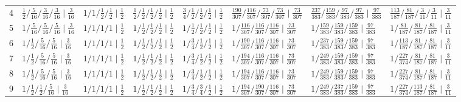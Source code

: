 {\begin{tabular}{rlllllll}
4 & $\tfrac{1}{2}/\tfrac{5}{16}/\tfrac{3}{16}/\tfrac{3}{16} \mid \tfrac{3}{16}$ & $1/1/\tfrac{1}{2}/\tfrac{1}{2} \mid \tfrac{1}{2}$ & $\tfrac{1}{2}/\tfrac{1}{2}/\tfrac{1}{2}/\tfrac{1}{2} \mid \tfrac{1}{2}$ & $\tfrac{3}{4}/\tfrac{1}{2}/\tfrac{1}{2}/\tfrac{1}{2} \mid \tfrac{1}{2}$ & $\tfrac{190}{307}/\tfrac{116}{307}/\tfrac{73}{307}/\tfrac{73}{307} \mid \tfrac{73}{307}$ & $\tfrac{237}{383}/\tfrac{159}{383}/\tfrac{97}{383}/\tfrac{97}{383} \mid \tfrac{97}{383}$ & $\tfrac{113}{187}/\tfrac{81}{187}/\tfrac{3}{11}/\tfrac{3}{11} \mid \tfrac{3}{11}$\\
5 & $1/\tfrac{5}{16}/\tfrac{5}{16}/\tfrac{5}{16} \mid \tfrac{3}{16}$ & $1/1/1/1 \mid \tfrac{1}{2}$ & $1/\tfrac{1}{2}/\tfrac{1}{2}/\tfrac{1}{2} \mid \tfrac{1}{2}$ & $1/\tfrac{1}{2}/\tfrac{1}{2}/\tfrac{1}{2} \mid \tfrac{1}{2}$ & $1/\tfrac{116}{307}/\tfrac{116}{307}/\tfrac{116}{307} \mid \tfrac{73}{307}$ & $1/\tfrac{159}{383}/\tfrac{159}{383}/\tfrac{159}{383} \mid \tfrac{97}{383}$ & $1/\tfrac{81}{187}/\tfrac{81}{187}/\tfrac{81}{187} \mid \tfrac{3}{11}$\\
6 & $1/\tfrac{1}{2}/\tfrac{5}{16}/\tfrac{5}{16} \mid \tfrac{3}{16}$ & $1/1/1/1 \mid \tfrac{1}{2}$ & $1/\tfrac{1}{2}/\tfrac{1}{2}/\tfrac{1}{2} \mid \tfrac{1}{2}$ & $1/\tfrac{3}{4}/\tfrac{1}{2}/\tfrac{1}{2} \mid \tfrac{1}{2}$ & $1/\tfrac{190}{307}/\tfrac{116}{307}/\tfrac{116}{307} \mid \tfrac{73}{307}$ & $1/\tfrac{237}{383}/\tfrac{159}{383}/\tfrac{159}{383} \mid \tfrac{97}{383}$ & $1/\tfrac{113}{187}/\tfrac{81}{187}/\tfrac{81}{187} \mid \tfrac{3}{11}$\\
7 & $1/\tfrac{1}{2}/\tfrac{5}{16}/\tfrac{5}{16} \mid \tfrac{3}{16}$ & $1/1/1/1 \mid \tfrac{1}{2}$ & $1/\tfrac{1}{2}/\tfrac{1}{2}/\tfrac{1}{2} \mid \tfrac{1}{2}$ & $1/\tfrac{3}{4}/\tfrac{1}{2}/\tfrac{1}{2} \mid \tfrac{1}{2}$ & $1/\tfrac{194}{307}/\tfrac{116}{307}/\tfrac{116}{307} \mid \tfrac{73}{307}$ & $1/\tfrac{249}{383}/\tfrac{159}{383}/\tfrac{159}{383} \mid \tfrac{97}{383}$ & $1/\tfrac{227}{374}/\tfrac{81}{187}/\tfrac{81}{187} \mid \tfrac{3}{11}$\\
8 & $1/\tfrac{1}{2}/\tfrac{5}{16}/\tfrac{5}{16} \mid \tfrac{3}{16}$ & $1/1/1/1 \mid \tfrac{1}{2}$ & $1/\tfrac{1}{2}/\tfrac{1}{2}/\tfrac{1}{2} \mid \tfrac{1}{2}$ & $1/\tfrac{3}{4}/\tfrac{1}{2}/\tfrac{1}{2} \mid \tfrac{1}{2}$ & $1/\tfrac{194}{307}/\tfrac{116}{307}/\tfrac{116}{307} \mid \tfrac{73}{307}$ & $1/\tfrac{249}{383}/\tfrac{159}{383}/\tfrac{159}{383} \mid \tfrac{97}{383}$ & $1/\tfrac{227}{374}/\tfrac{81}{187}/\tfrac{81}{187} \mid \tfrac{3}{11}$\\
9 & $1/\tfrac{1}{2}/\tfrac{1}{2}/\tfrac{5}{16} \mid \tfrac{3}{16}$ & $1/1/1/1 \mid \tfrac{1}{2}$ & $1/\tfrac{1}{2}/\tfrac{1}{2}/\tfrac{1}{2} \mid \tfrac{1}{2}$ & $1/\tfrac{3}{4}/\tfrac{3}{4}/\tfrac{1}{2} \mid \tfrac{1}{2}$ & $1/\tfrac{194}{307}/\tfrac{190}{307}/\tfrac{116}{307} \mid \tfrac{73}{307}$ & $1/\tfrac{249}{383}/\tfrac{237}{383}/\tfrac{159}{383} \mid \tfrac{97}{383}$ & $1/\tfrac{227}{374}/\tfrac{113}{187}/\tfrac{81}{187} \mid \tfrac{3}{11}$\\

\end{tabular}}
